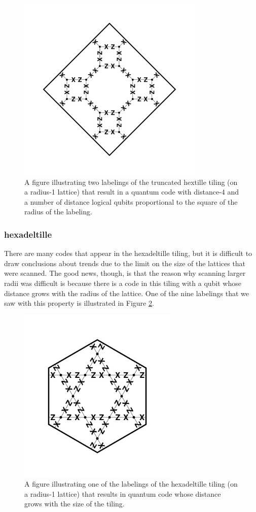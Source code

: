 \documentclass[twocolumn,showpacs,preprintnumbers,amsmath,amssymb,nofootinbib,pra,floatfix]{revtex4-1}
\begin{document}
\begin{figure}
\includegraphics[width=3.5in]{truncated-quadrille-code-4-labeling-1} %
\caption{
\label{figure:truncated-hextille-code-4-labelings}
A figure illustrating two labelings of the truncated hextille tiling (on a radius-1 lattice) that result in a quantum code with distance-4 and a number of distance logical qubits proportional to the square of the radius of the labeling.
}
\end{figure}
\subsubsection{hexadeltille}

There are many codes that appear in the hexadeltille tiling, but it is difficult to draw conclusions about trends due to the limit on the size of the lattices that were scanned.  The good news, though, is that the reason why scanning larger radii was difficult is because there is a code in this tiling with a qubit whose distance grows with the radius of the lattice.  One of the nine labelings that we saw with this property is illustrated in Figure \ref{figure:hexadeltille-code-labeling}. 

\begin{figure}
\includegraphics[width=3in]{hexadeltille-code-labeling}
\caption{
\label{figure:hexadeltille-code-labeling}
A figure illustrating one of the labelings of the hexadeltille tiling (on a radius-1 lattice) that results in quantum code whose distance grows with the size of the tiling.
}
\end{figure}
\end{document}
